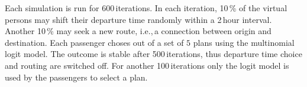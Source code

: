 
Each simulation is run for 600\,iterations.
In each iteration, 10\,\% of the virtual persons may shift their departure time randomly within a 2\,hour interval.
Another 10\,\% may seek a new route, i.e.,\,a connection between origin and destination. 
Each passenger choses out of a set of $5$ plans using the multinomial logit model. %
The outcome is stable after 500\,iterations, thus departure time choice and routing are switched off. 
For another 100\,iterations only the logit model is used by the passengers to select a plan. 




